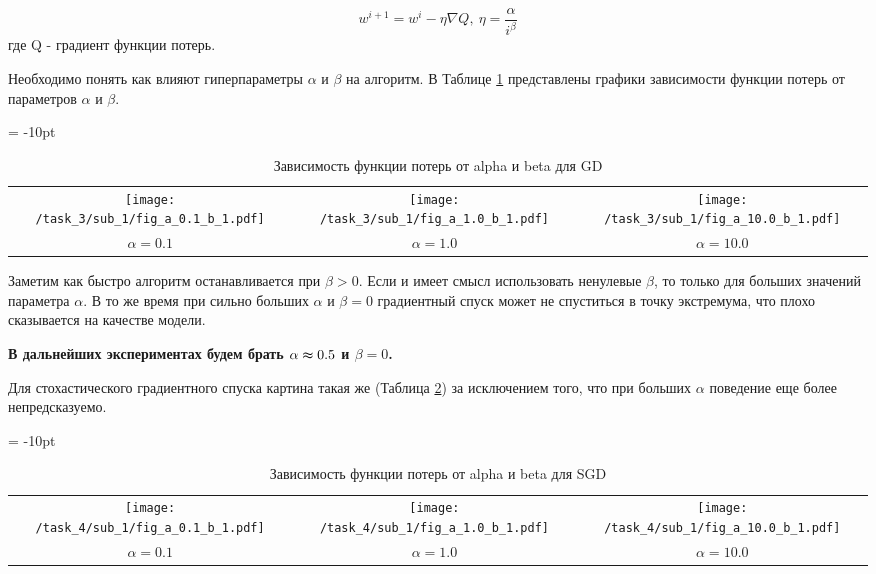 \documentclass[12pt,fleqn]{article}
\begin{document}
$$
    w^{i+1} = w^i - \eta  \nabla Q, \:
    \eta = \frac{\alpha}{i^\beta}
$$
где Q - градиент функции потерь.

\noindent Необходимо понять как влияют гиперпараметры $\alpha$ и $\beta$ на алгоритм.
\noindent В Таблице \ref{pic:GD_alpha_beta} представлены 
графики зависимости функции потерь от параметров $\alpha$ и $\beta$.

\begin{table}[htb]
    \centering
    \tabcolsep = -10pt
    \begin{tabular}{ccc}
        \texttt{[image: /task\_3/sub\_1/fig\_a\_0.1\_b\_1.pdf]}  & 
        \texttt{[image: /task\_3/sub\_1/fig\_a\_1.0\_b\_1.pdf]} &
         \texttt{[image: /task\_3/sub\_1/fig\_a\_10.0\_b\_1.pdf]} \\
         $\alpha = 0.1$ & $\alpha = 1.0$ & $\alpha = 10.0$
    \end{tabular}
    \caption{Зависимость функции потерь от alpha и beta для GD}
    \label{pic:GD_alpha_beta}
\end{table}

\newpage

Заметим как быстро алгоритм останавливается при $\beta>0$. Если и имеет смысл 
использовать ненулевые $\beta$, то только для больших значений параметра $\alpha$.
В то же время при сильно больших $\alpha$ и $\beta=0$ градиентный спуск может не
спуститься в точку экстремума, что плохо сказывается на качестве модели.

\textbf{В дальнейших экспериментах будем брать $\alpha\thickapprox 0.5$ и $\beta=0$.}

Для стохастического градиентного спуска картина такая же
(Таблица \ref{pic:SGD_alpha_beta}) за исключением того, что при 
больших $\alpha$ поведение еще более непредсказуемо. 

\begin{table}[htb]
    \centering
    \tabcolsep = -10pt
    \begin{tabular}{ccc}
        \texttt{[image: /task\_4/sub\_1/fig\_a\_0.1\_b\_1.pdf]}  & 
        \texttt{[image: /task\_4/sub\_1/fig\_a\_1.0\_b\_1.pdf]} &
         \texttt{[image: /task\_4/sub\_1/fig\_a\_10.0\_b\_1.pdf]} \\
         $\alpha = 0.1$ & $\alpha = 1.0$ & $\alpha = 10.0$
    \end{tabular}
    \caption{Зависимость функции потерь от alpha и beta для SGD}
    \label{pic:SGD_alpha_beta}
\end{table}
\end{document}
